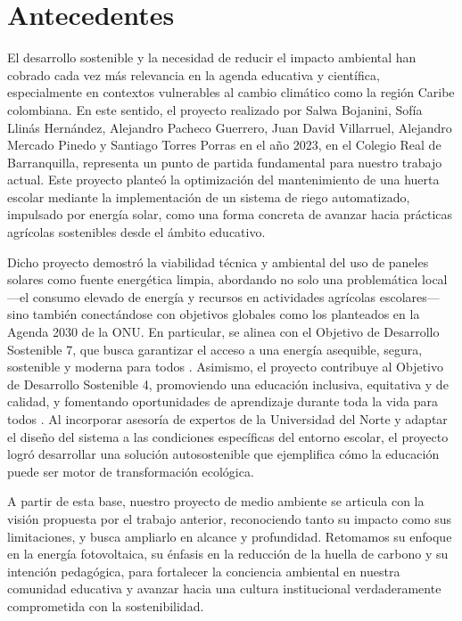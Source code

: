 \documentclass[12pt]{article}
\begin{document}
\section{Antecedentes}
El desarrollo sostenible y la necesidad de reducir el impacto ambiental han cobrado cada vez más relevancia en la agenda educativa y científica, especialmente en contextos vulnerables al cambio climático como la región Caribe colombiana. En este sentido, el proyecto realizado por Salwa Bojanini, Sofía Llinás Hernández, Alejandro Pacheco Guerrero, Juan David Villarruel, Alejandro Mercado Pinedo y Santiago Torres Porras en el año 2023, en el Colegio Real de Barranquilla, representa un punto de partida fundamental para nuestro trabajo actual. Este proyecto planteó la optimización del mantenimiento de una huerta escolar mediante la implementación de un sistema de riego automatizado, impulsado por energía solar, como una forma concreta de avanzar hacia prácticas agrícolas sostenibles desde el ámbito educativo.

Dicho proyecto demostró la viabilidad técnica y ambiental del uso de paneles solares como fuente energética limpia, abordando no solo una problemática local —el consumo elevado de energía y recursos en actividades agrícolas escolares— sino también conectándose con objetivos globales como los planteados en la Agenda 2030 de la ONU. En particular, se alinea con el Objetivo de Desarrollo Sostenible 7, que busca garantizar el acceso a una energía asequible, segura, sostenible y moderna para todos \cite{turn0search0}. Asimismo, el proyecto contribuye al Objetivo de Desarrollo Sostenible 4, promoviendo una educación inclusiva, equitativa y de calidad, y fomentando oportunidades de aprendizaje durante toda la vida para todos \cite{turn0search2}. Al incorporar asesoría de expertos de la Universidad del Norte y adaptar el diseño del sistema a las condiciones específicas del entorno escolar, el proyecto logró desarrollar una solución autosostenible que ejemplifica cómo la educación puede ser motor de transformación ecológica.


A partir de esta base, nuestro proyecto de medio ambiente se articula con la visión propuesta por el trabajo anterior, reconociendo tanto su impacto como sus limitaciones, y busca ampliarlo en alcance y profundidad. Retomamos su enfoque en la energía fotovoltaica, su énfasis en la reducción de la huella de carbono y su intención pedagógica, para fortalecer la conciencia ambiental en nuestra comunidad educativa y avanzar hacia una cultura institucional verdaderamente comprometida con la sostenibilidad.
\end{document}
